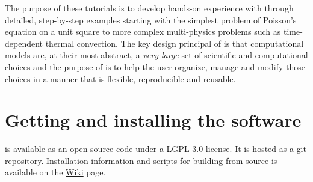 The purpose of these tutorials is to develop hands-on experience with
\TF{} through detailed, step-by-step examples starting with the
simplest problem of Poisson's equation on a unit square to more
complex multi-physics problems such as time-dependent thermal
convection.  The key design principal of \TF{} is that computational
models are, at their most abstract, a \emph{very large} set of
scientific and computational choices and the purpose of \TF{} is to
help the user organize, manage and modify those choices in a manner
that is flexible, reproducible and reusable.

\pagebreak{}
\section{Getting and installing the \TF{} software}
\label{sec:gett-inst-tf}

\TF{} is available as an open-source code under a LGPL 3.0
license.  It is hosted as a
\href{https://bitbucket.org/tferma/tferma}{git repository}.
Installation information and scripts for building from source is available on the
\href{https://bitbucket.org/tferma/tferma/wiki}{Wiki} page. 


